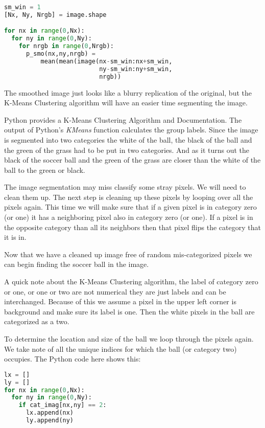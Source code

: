 \begin{lstlisting}[language=Python]
sm_win = 1
[Nx, Ny, Nrgb] = image.shape

for nx in range(0,Nx):
  for ny in range(0,Ny):
    for nrgb in range(0,Nrgb):
      p_smo(nx,ny,nrgb) =
          mean(mean(image(nx-sm_win:nx+sm_win,
                          ny-sm_win:ny+sm_win,
                          nrgb))
\end{lstlisting}

The smoothed image just looks like a blurry replication of the original, but the K-Means Clustering algorithm will have an easier time segmenting the image.

Python provides a K-Means Clustering Algorithm and Documentation. The output of Python's \emph{KMeans} function calculates the group labels. Since the image is segmented into two categories the white of the ball, the black of the ball and the green of the grass had to be put in two categories. And as it turns out the black of the soccer ball and the green of the grass are closer than the white of the ball to the green or black.

The image segmentation may miss classify some stray pixels. We will need to clean them up. The next step is cleaning up these pixels by looping over all the pixels again. This time we will make sure that if a given pixel is in category zero (or one) it has a neighboring pixel also in category zero (or one). If a pixel is in the opposite category than all its neighbors then that pixel flips the category that it is in. 

Now that we have a cleaned up image free of random mis-categorized pixels we can begin finding the soccer ball in the image.

A quick note about the K-Means Clustering algorithm, the label of category zero or one, or one or two are not numerical they are just labels and can be interchanged. Because of this we assume a pixel in the upper left corner is background and make sure its label is one. Then the white pixels in the ball are categorized as a two.

To determine the location and size of the ball we loop through the pixels again. We take note of all the unique indices for which the ball (or category two) occupies. The Python code here shows this:

\begin{lstlisting}[language=Python]
lx = []
ly = []
for nx in range(0,Nx):
  for ny in range(0,Ny):
    if cat_imag[nx,ny] == 2:
      lx.append(nx)
      ly.append(ny)
\end{lstlisting}

